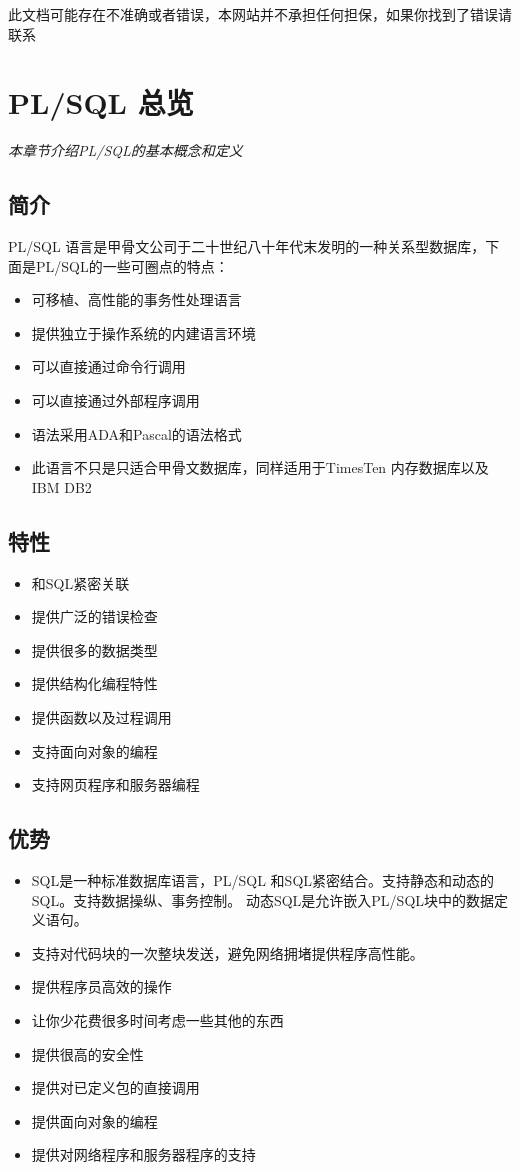 \documentclass{article}
\begin{document}
此文档可能存在不准确或者错误，本网站并不承担任何担保，如果你找到了错误请联系


\section{PL/SQL 总览}
\textit{本章节介绍PL/SQL的基本概念和定义}
\subsection{简介}
PL/SQL 语言是甲骨文公司于二十世纪八十年代末发明的一种关系型数据库，下面是PL/SQL的一些可圈点的特点：
\begin{itemize}
\item 可移植、高性能的事务性处理语言
\item 提供独立于操作系统的内建语言环境
\item 可以直接通过命令行调用
\item 可以直接通过外部程序调用
\item 语法采用ADA和Pascal的语法格式
\item 此语言不只是只适合甲骨文数据库，同样适用于TimesTen 内存数据库以及IBM DB2
\end{itemize}

\subsection{特性}
\begin{itemize}
\item 和SQL紧密关联
\item 提供广泛的错误检查
\item 提供很多的数据类型
\item 提供结构化编程特性
\item 提供函数以及过程调用
\item 支持面向对象的编程
\item 支持网页程序和服务器编程
\end{itemize}

\subsection{优势}
\begin{itemize}
\item SQL是一种标准数据库语言，PL/SQL 和SQL紧密结合。支持静态和动态的SQL。支持数据操纵、事务控制。
动态SQL是允许嵌入PL/SQL块中的数据定义语句。
\item 支持对代码块的一次整块发送，避免网络拥堵提供程序高性能。
\item 提供程序员高效的操作
\item 让你少花费很多时间考虑一些其他的东西
\item 提供很高的安全性
\item 提供对已定义包的直接调用
\item 提供面向对象的编程
\item 提供对网络程序和服务器程序的支持
\end{itemize}
\end{document}
